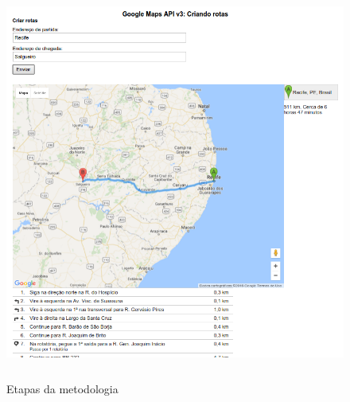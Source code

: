 \begin{figure}[ht]
\centering
\caption{Etapas da metodologia}
\includegraphics[width=150mm, height=130mm]{Figuras/Cronograma/GoogleMaps.png}
\end{figure}